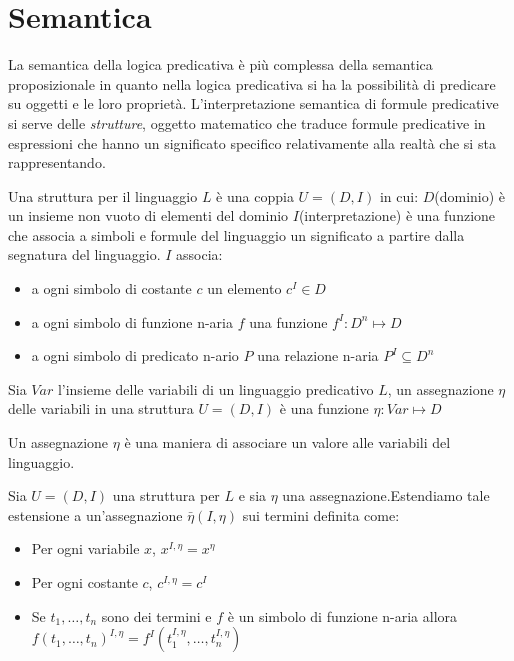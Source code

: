 \section{Semantica}
La semantica della logica predicativa è più complessa della semantica proposizionale
in quanto nella logica predicativa si ha la possibilità di predicare su oggetti e le loro proprietà.
L'interpretazione semantica di formule predicative si serve delle \emph{strutture},
oggetto matematico che traduce formule predicative in espressioni che hanno un significato
specifico relativamente alla realtà che si sta rappresentando.

\begin{defi}
    Una struttura per il linguaggio $L$ è una coppia $U = (D,I)$ in cui:
    $D$(dominio) è un insieme non vuoto di elementi del dominio
    $I$(interpretazione) è una funzione che associa a simboli e formule del linguaggio
    un significato  a partire dalla segnatura del linguaggio.
    $I$ associa:
    \begin{itemize}
        \item a ogni simbolo di costante $c$ un elemento $c^I \in D$
        \item a ogni simbolo di funzione n-aria $f$ una funzione $f^I:D^n \mapsto D$
        \item a ogni simbolo di predicato n-ario $P$ una relazione n-aria $P^I \subseteq D^n$
    \end{itemize}
\end{defi}

\begin{defi}
    Sia $Var$ l'insieme delle variabili di un linguaggio predicativo $L$, un assegnazione $\eta$
    delle variabili in una struttura $U = (D,I)$ è una funzione $\eta:Var \mapsto D$
\end{defi}
Un assegnazione $\eta$ è una maniera di associare un valore alle variabili del linguaggio.

\begin{defi}
    Sia $U =(D,I)$ una struttura per $L$ e sia $\eta$ una assegnazione.Estendiamo
    tale estensione a un'assegnazione $\bar{\eta}(I,\eta)$ sui termini definita come:
    \begin{itemize}
        \item Per ogni variabile $x$, $x^{I,\eta} = x^{\eta}$
        \item Per ogni costante $c$, $c ^{I,\eta} = c^I$
        \item Se $t_1,\dots,t_n$ sono dei termini e $f$ è un simbolo di funzione n-aria
              allora $f(t_1,\dots,t_n)^{I,\eta} = f^I(t_1 ^{I,\eta},\dots,t_n ^{I,\eta})$
    \end{itemize}
\end{defi}

